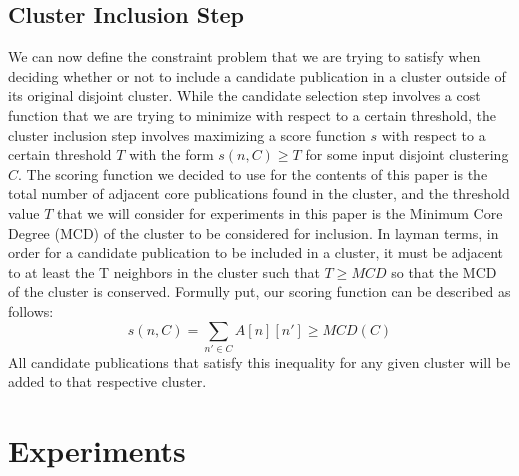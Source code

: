 \documentclass{article}
\begin{document}
\subsection{Cluster Inclusion Step}
We can now define the constraint problem that we are trying to satisfy when deciding whether or not to include a candidate publication in a cluster outside of its original disjoint cluster. While the candidate selection step involves a cost function that we are trying to minimize with respect to a certain threshold, the cluster inclusion step involves maximizing a score function $s$ with respect to a certain threshold $T$ with the form $s(n, C) \geq T$ for some input disjoint clustering $C$.
\newline\newline
The scoring function we decided to use for the contents of this paper is the total number of adjacent core publications found in the cluster, and the threshold value $T$ that we will consider for experiments in this paper is the Minimum Core Degree (MCD) of the cluster to be considered for inclusion. In layman terms, in order for a candidate publication to be included in a cluster, it must be adjacent to at least the T neighbors in the cluster such that $T \geq MCD$ so that the MCD of the cluster is conserved. Formully put, our scoring function can be described as follows:
$$s(n, C) =\sum_{n' \in C} A[n][n'] \geq MCD(C)$$
All candidate publications that satisfy this inequality for any given cluster will be added to that respective cluster. 



\section{Experiments}
\end{document}
